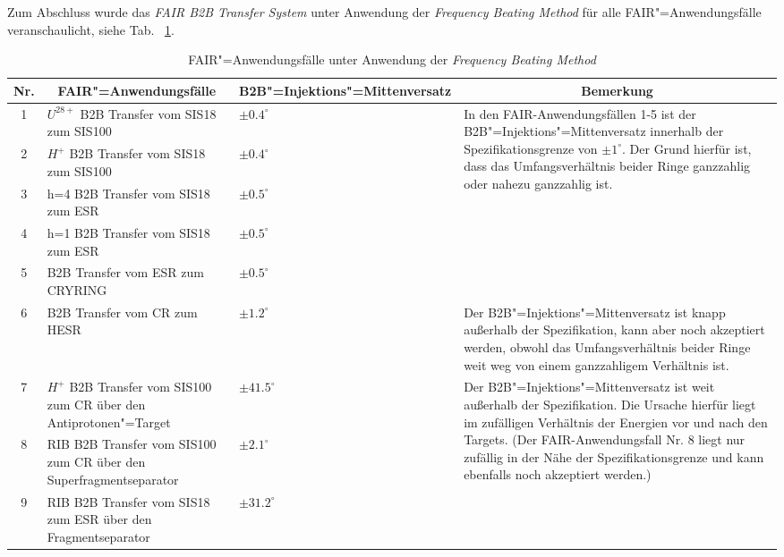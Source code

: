 Zum Abschluss wurde das \textit{FAIR B2B Transfer System} unter Anwendung der \textit{Frequency Beating Method} f\"ur alle FAIR"=Anwendungsf\"alle veranschaulicht, siehe Tab. ~\ref{use_application1}. 


\begin{table}[H]
\newcommand{\tabincell}[2]{\begin{tabular}{@{}#1@{}}#2\end{tabular}}
\caption{FAIR"=Anwendungsf\"alle unter Anwendung der \textit{Frequency Beating Method}}
\label{use_application1}
\begin{center}
    \begin{tabular}{ | c | p{4cm}|  p{2cm} |p{6cm} |}
    \hline
     	Nr. & \multicolumn{1}{|c|}{FAIR"=Anwendungsf\"alle} & B2B"=Injektions"=Mittenversatz & \multicolumn{1}{|c|}{Bemerkung} \\ \hline
1&	$U^{28+}$ B2B Transfer vom SIS18 zum SIS100	&	$\pm0.4^\circ$ 	& \multirow{5}{*}{\parbox{6cm}{In den FAIR-Anwendungsfällen 1-5 ist der B2B"=Injektions"=Mittenversatz innerhalb der Spezifikationsgrenze von $\pm1^\circ$. Der Grund hierfür ist, dass das Umfangsverhältnis beider Ringe ganzzahlig oder nahezu ganzzahlig ist. }}\\ \cline{1-2}
2&$H^{+}$ B2B Transfer vom SIS18 zum SIS100	&	$\pm0.4^\circ$	&	\\ \cline{1-3}
3&h=4 B2B Transfer vom SIS18 zum ESR				&	$\pm0.5^\circ$	&	\\ \cline{1-3}
4&h=1 B2B Transfer vom SIS18 zum ESR			&	$\pm0.5^\circ$	&  \\ \cline{1-3}
5&B2B Transfer vom ESR zum CRYRING		&	$\pm0.5^\circ$	&	\\ \hline
6&B2B Transfer vom CR zum HESR			&$\pm1.2^\circ$		 & Der B2B"=Injektions"=Mittenversatz ist knapp außerhalb der Spezifikation, kann aber noch akzeptiert werden, obwohl das Umfangsverhältnis beider Ringe weit weg von einem ganzzahligem Verhältnis ist.\\ \hline

7&$H^{+}$ B2B Transfer vom SIS100 zum CR \"uber den Antiprotonen"=Target			&$\pm41.5^\circ$& \multirow{5}{*}{\parbox{6cm}{Der B2B"=Injektions"=Mittenversatz ist weit außerhalb der Spezifikation. Die Ursache hierfür liegt im zufälligen Verhältnis der Energien vor und nach den Targets. (Der FAIR-Anwendungsfall Nr. 8 liegt nur zufällig in der Nähe der Spezifikationsgrenze und kann ebenfalls noch akzeptiert werden.) }}\\ \cline{1-3}
8&RIB B2B Transfer vom SIS100 zum CR \"uber den Superfragmentseparator					&	$\pm2.1^\circ$	& \\ \cline{1-3}

9&RIB B2B Transfer vom SIS18 zum ESR \"uber den Fragmentseparator	&$\pm31.2^\circ$	&		\\ \hline

    \end{tabular}
\end{center}
\end{table}

